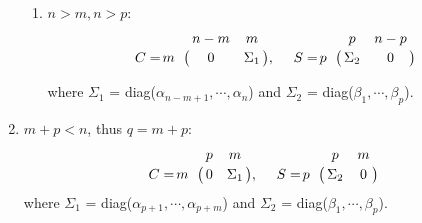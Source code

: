 \begin{enumerate}
\begin{enumerate}
                    \item $n > m, n > p$:
                        \begin{displaymath}
                            C = \bordermatrix{ & n-m & m   \cr
                            \hfill m & 0 & \Sigma_1}, \  \ \ \
                            S = \bordermatrix{ & p & n-p   \cr
                            \hfill p & \Sigma_2 & 0}
                        \end{displaymath}
                        
                        where $\Sigma_1$ = diag($\alpha_{n-m+1}, \cdots, \alpha_{n}$) and $\Sigma_2$ = diag($\beta_1, \cdots, \beta_p$).
                \end{enumerate}
            \item $m + p < n$, thus $q = m+p$:
                \begin{displaymath}
                    C = \bordermatrix{ & p & m   \cr
                    \hfill m & 0 & \Sigma_1}, \  \ \ \
                    S = \bordermatrix{ & p & m   \cr
                    \hfill p & \Sigma_2 & 0}
                \end{displaymath}
                where $\Sigma_1$ = diag($\alpha_{p+1}, \cdots, \alpha_{p+m}$) and $\Sigma_2$ = diag($\beta_1, \cdots, \beta_p$).
        \end{enumerate}
        
